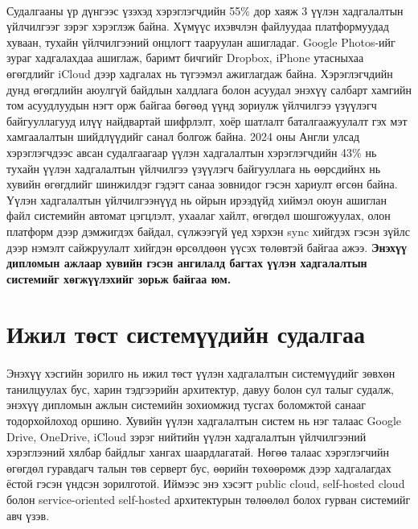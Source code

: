 \paragraph{}
Судалгааны үр дүнгээс үзэхэд хэрэглэгчдийн 55\% дор хаяж 3 үүлэн хадгалалтын үйлчилгээг зэрэг хэрэглэж байна. Хүмүүс ихэвчлэн файлуудаа платформуудад хуваан, тухайн үйлчилгээний онцлогт тааруулан ашигладаг. Google Photos-ийг зураг хадгалахдаа ашиглаж, баримт бичгийг Dropbox, iPhone утасныхаа өгөгдлийг iCloud дээр хадгалах нь түгээмэл ажиглагдаж байна. Хэрэглэгчдийн дунд өгөгдлийн аюулгүй байдлын халдлага болон асуудал энэхүү салбарт хамгийн том асуудлуудын нэгт орж байгаа бөгөөд үүнд зориулж үйлчилгээ үзүүлэгч байгууллагууд илүү найдвартай шифрлэлт, хоёр шатлалт баталгаажуулалт гэх мэт хамгаалалтын шийдлүүдийг санал болгож байна. 2024 оны Англи улсад хэрэглэгчдээс авсан судалгаагаар үүлэн хадгалалтын хэрэглэгчдийн 43\% нь тухайн үүлэн хадгалалтын үйлчилгээ үзүүлэгч байгууллага нь өөрсдийнх нь хувийн өгөгдлийг шинжилдэг гэдэгт санаа зовнидог гэсэн хариулт өгсөн байна. Үүлэн хадгалалтын үйлчилгээнүүд нь ойрын ирээдүйд хиймэл оюун ашиглан файл системийн автомат цэгцлэлт, ухаалаг хайлт, өгөгдөл шошгожуулах, олон платформ дээр дэмжигдэх байдал, сүлжээгүй үед хэрхэн sync хийгдэх гэсэн зүйлс дээр нэмэлт сайжруулалт хийгдэн өрсөлдөөн үүсэх төлөвтэй байгаа ажээ. \textbf{Энэхүү дипломын ажлаар хувийн гэсэн ангилалд багтах үүлэн хадгалалтын системийг хөгжүүлэхийг зорьж байгаа юм.}

\section{Ижил төст системүүдийн судалгаа}

\paragraph{}
Энэхүү хэсгийн зорилго нь ижил төст үүлэн хадгалалтын системүүдийг зөвхөн танилцуулах бус, харин тэдгээрийн архитектур, давуу болон сул талыг судалж, энэхүү дипломын ажлын системийн зохиомжид тусгах боломжтой санааг тодорхойлоход оршино. Хувийн үүлэн хадгалалтын систем нь нэг талаас Google Drive, OneDrive, iCloud зэрэг нийтийн үүлэн хадгалалтын үйлчилгээний хэрэглээний хялбар байдлыг хангах шаардлагатай. Нөгөө талаас хэрэглэгчийн өгөгдөл гуравдагч талын төв серверт бус, өөрийн төхөөрөмж дээр хадгалагдах ёстой гэсэн үндсэн зорилготой. Иймээс энэ хэсэгт public cloud, self-hosted cloud болон service-oriented self-hosted архитектурын төлөөлөл болох гурван системийг авч үзэв.


